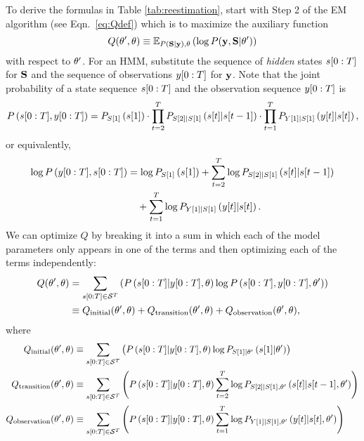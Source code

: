 To derive the formulas in Table \ref{tab:reestimation}, start with
Step 2 of the EM algorithm (see Eqn.~\eqref{eq:Qdef}) which is to
maximize the auxiliary function
\begin{equation*}
  Q(\theta',\theta) \equiv \mathbb{E}_{P \left({\bf S}|\mathbf{y} \right),\theta}
  \left( \log P(\mathbf{y},{\bf S}|\theta') \right)
\end{equation*}
with respect to $\theta'$.  For an HMM, substitute the sequence of
\emph{hidden} states $s[0:T]$ for ${\bf S}$ and the sequence of
observations $y[0:T]$ for $\mathbf{y}$.  Note that the joint probability
of a state sequence $s[0:T]$ and the observation sequence
$y[0:T]$ is
\begin{equation*}
  P\left( s[0:T],y[0:T] \right) = P_{{S}{[1]}}
  \left({s}{[1]} \right) \cdot \prod_{t=2}^T P_{{S}{[2]}|{S}{[1]}}
  \left({s}{[t]}|{s}{[t-1]} \right)
  \cdot \prod_{t=1}^T  P_{{Y}{[1]}|{S}{[1]}}
  \left({y}{[t]}|{s}{[t]} \right),
\end{equation*}
or equivalently,
\begin{align*}
  \log P\left(y[0:T], s[0:T] \right) &= \log P_{{S}{[1]}}
  \left({s}{[1]} \right) + \sum_{t=2}^T \log P_{{S}{[2]}|{S}{[1]}}
  \left({s}{[t]}|{s}{[t-1]} \right)\\
  &\quad + \sum_{t=1}^T \log  P_{{Y}{[1]}|{S}{[1]}}
  \left({y}{[t]}|{s}{[t]} \right).
\end{align*}
We can optimize $Q$ by breaking it into a sum in which each of the
model parameters only appears in one of the terms and then optimizing
each of the terms independently:
\begin{align}
  \label{eq:QHMM}
  Q(\parameters',\parameters) &= \sum_{\ts{s}{0}{T}\in\states^T}
  \left( P
  \left(\ts{s}{0}{T}|\ts{y}{0}{T},\parameters \right) \log P
  \left(\ts{s}{0}{T},\ts{y}{0}{T},\parameters' \right) \right) \\
  \label{eq:QHMMseparate}
  & \equiv Q_{\text{initial}} (\parameters',\parameters) +
  Q_{\text{transition}} (\parameters',\parameters) + Q_{\text{observation}}
  (\parameters',\parameters),
\end{align}
where
\begin{align}
  \label{eq:Qinitial}
  Q_{\text{initial}} (\parameters',\parameters) &\equiv
%
  \sum_{\ts{s}{0}{T}\in\states^T} \left( P
  \left(\ts{s}{0}{T}|\ts{y}{0}{T},\parameters \right) \log P_{\ti{S}{1}|\parameters'}
  \left(\ti{s}{1}|\parameters' \right) \right)\\
%
  \label{eq:Qtransition}
  Q_{\text{transition}} (\parameters',\parameters) &\equiv
%
  \sum_{\ts{s}{0}{T}\in\states^T} \left( P
  \left(\ts{s}{0}{T}|\ts{y}{0}{T},\parameters \right) \sum_{t=2}^T \log
  P_{\ti{S}{2}|\ti{S}{1},\parameters'}
  \left(\ti{s}{t}|\ti{s}{t-1},\parameters' \right) \right) \\
%
  \label{eq:Qoutput}
  Q_{\text{observation}} (\parameters',\parameters) &\equiv
%
  \sum_{\ts{s}{0}{T}\in\states^T} \left( P
  \left(\ts{s}{0}{T}|\ts{y}{0}{T},\parameters \right) \sum_{t=1}^T \log
  P_{\ti{Y}{1}|\ti{S}{1},\parameters'}
  \left(\ti{y}{t}|\ti{s}{t},\parameters' \right) \right)
%
\end{align}

